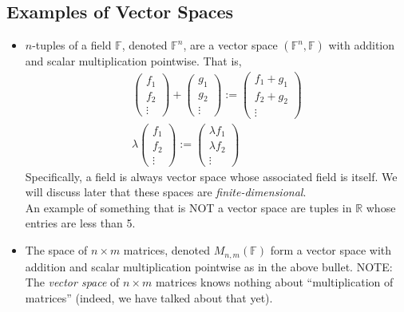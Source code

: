 \documentclass[11pt, reqno]{amsart}
\theoremstyle{definition} %
\newcommand{\R}{\mathbb{R}}
\newcommand{\F}{\mathbb{F}}
\begin{document}
\subsection{Examples of Vector Spaces}
\begin{itemize}[itemsep=0.5em, topsep=0.5em]
    \item $n$-tuples of a field $\F$, denoted $\F^n$, are a vector space $(\F^n,\F)$ with addition and scalar multiplication pointwise. That is,
    \begin{gather}
        \begin{pmatrix}
            f_1 \\
            f_2 \\
            \vdots
        \end{pmatrix}
        +
        \begin{pmatrix}
            g_1 \\
            g_2 \\
            \vdots
        \end{pmatrix}
        :=
        \begin{pmatrix}
            f_1+g_1 \\
            f_2+g_2 \\
            \vdots
        \end{pmatrix}
        \\[.4em]
        \lambda 
        \begin{pmatrix}
            f_1 \\
            f_2 \\
            \vdots
        \end{pmatrix}
        :=
        \begin{pmatrix}
            \lambda f_1 \\
            \lambda f_2 \\
            \vdots
        \end{pmatrix}
    \end{gather}
    Specifically, a field is always vector space whose associated field is itself. We will discuss later that these spaces are \emph{finite-dimensional}.\\
    \indent An example of something that is NOT a vector space are tuples in $\R$ whose entries are less than 5.
    \item The space of $n\times m$ matrices, denoted $M_{n,m}(\F)$ form a vector space with addition and scalar multiplication pointwise as in the above bullet. NOTE: The \emph{vector space} of $n\times m$ matrices knows nothing about ``multiplication of matrices'' (indeed, we have talked about that yet).

\end{itemize}
\end{document}
